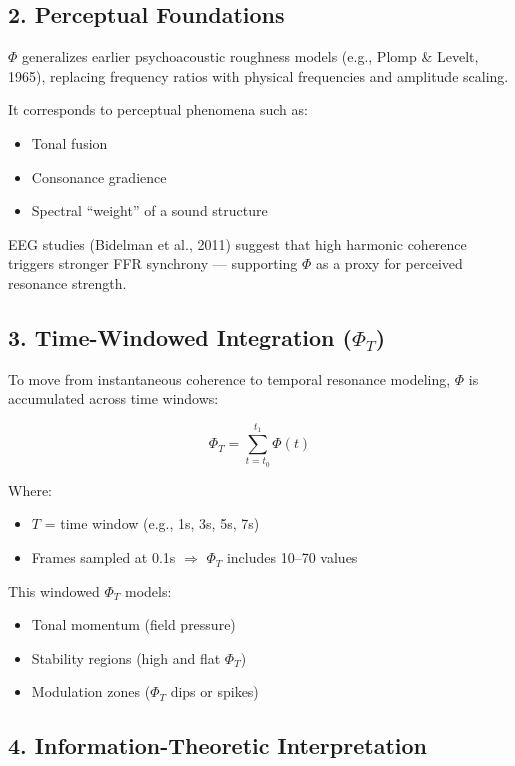 \documentclass{article}
\begin{document}
\subsection*{2. Perceptual Foundations}

$\Phi$ generalizes earlier psychoacoustic roughness models (e.g., Plomp \& Levelt, 1965), replacing frequency ratios with physical frequencies and amplitude scaling.

It corresponds to perceptual phenomena such as:

\begin{itemize}
    \item Tonal fusion
    \item Consonance gradience
    \item Spectral “weight” of a sound structure
\end{itemize}

EEG studies (Bidelman et al., 2011) suggest that high harmonic coherence triggers stronger FFR synchrony — supporting $\Phi$ as a proxy for perceived resonance strength.

\subsection*{3. Time-Windowed Integration ($\Phi_T$)}

To move from instantaneous coherence to temporal resonance modeling, $\Phi$ is accumulated across time windows:

\[
\Phi_T = \sum_{t=t_0}^{t_1} \Phi(t)
\]

Where:

\begin{itemize}
    \item $T$ = time window (e.g., 1s, 3s, 5s, 7s)
    \item Frames sampled at 0.1s $\Rightarrow$ $\Phi_T$ includes 10–70 values
\end{itemize}

This windowed $\Phi_T$ models:

\begin{itemize}
    \item Tonal momentum (field pressure)
    \item Stability regions (high and flat $\Phi_T$)
    \item Modulation zones ($\Phi_T$ dips or spikes)
\end{itemize}

\subsection*{4. Information-Theoretic Interpretation}
\end{document}
